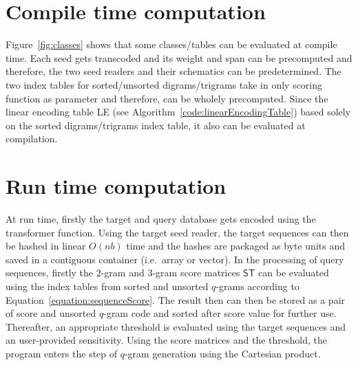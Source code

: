 \documentclass[twoside,a4paper,bsc]{master}
\newcommand{\Qgram}[1]{\(#1\)-gram}
\newcommand{\Scoretablename}[0]{\mathsf{ST}}
\begin{document}
\section{Compile time computation}
Figure~\ref{fig:classes} shows that some classes/tables can be evaluated at
compile time. Each seed gets transcoded and its weight and span can be
precomputed and therefore, the two seed readers and their schematics can be
predetermined. The two index tables for sorted/unsorted digrams/trigrams
take in only scoring function as parameter and therefore, can be wholely
precomputed. Since the linear encoding table LE (see
Algorithm~\ref{code:linearEncodingTable}) based solely on the sorted
digrams/trigrams index table, it also can be evaluated at compilation.
\section{Run time computation}
At run time, firstly the target and query database gets encoded using the
transformer function. Using the target seed reader, the target sequences
can then be hashed in linear \(O(nb)\) time and the hashes are packaged as
byte units and saved in a contiguous container (i.e.\ array or vector).
In the processing of query sequences, firstly the \Qgram{2} and \Qgram{3}
score matrices \(\Scoretablename\) can be evaluated using the index tables
from sorted and unsorted \Qgram{q}s according to
Equation~\ref{equation:sequenceScore}. The result then can then be stored
as a pair of score and unsorted \Qgram{q} code and sorted after score
value for further use. Thereafter, an appropriate threshold is evaluated
using the target sequences and an user-provided sensitivity. Using the
score matrices and the threshold, the program enters the step of \Qgram{q}
generation using the Cartesian product.
\end{document}
